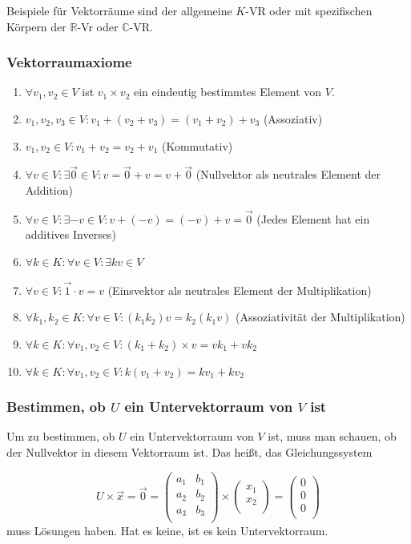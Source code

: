 \documentclass{scrartcl}
\begin{document}
Beispiele für Vektorräume sind der allgemeine $K$-VR oder mit spezifischen Körpern
der $\mathbb{R}$-Vr oder $\mathbb{C}$-VR.

\subsubsection{Vektorraumaxiome}

\begin{enumerate}
	\item $\forall v_1, v_2 \in V$ ist $v_1 \times v_2$ ein eindeutig bestimmtes Element von $V$.
	\item $v_1, v_2, v_3 \in V: v_1 + (v_2 + v_3) = (v_1 + v_2) + v_3$ (Assoziativ)
	\item $v_1, v_2 \in V: v_1 + v_2 = v_2 + v_1$ (Kommutativ)
	\item $\forall v \in V: \exists \vec{0} \in V: v = \vec{0} + v = v + \vec{0}$ (Nullvektor als neutrales Element der Addition)
	\item $\forall v \in V: \exists -v \in V: v + (-v) = (-v) + v = \vec{0}$ (Jedes Element hat ein additives Inverses)
	\item $\forall k \in K: \forall v \in V: \exists kv \in V$
	\item $\forall v \in V: \vec{1}\cdot v = v$ (Einsvektor als neutrales Element der Multiplikation)
	\item $\forall k_1, k_2 \in K: \forall v \in V: (k_1k_2)v = k_2(k_1v)$ (Assoziativität der Multiplikation)
	\item $\forall k \in K: \forall v_1, v_2 \in V: (k_1 + k_2) \times v = vk_1 + vk_2$
	\item $\forall k \in K: \forall v_1, v_2 \in V: k(v_1 + v_2) = kv_1 + kv_2$
\end{enumerate}

\subsubsection{Bestimmen, ob $U$ ein Untervektorraum von $V$ ist}

Um zu bestimmen, ob $U$ ein Untervektorraum von $V$ ist, muss man schauen, ob der Nullvektor in diesem Vektorraum ist.
Das heißt, das Gleichungssystem

\begin{equation}
	U\times\vec{x} = \vec{0} =
	\begin{pmatrix*}
		a_1 & b_1 \\
		a_2 & b_2 \\
		a_3 & b_3 \\
	\end{pmatrix*} \times \begin{pmatrix*}
		x_1 \\
		x_2 \\
	\end{pmatrix*} = \begin{pmatrix*}
		0 \\
		0 \\
		0 \\
	\end{pmatrix*}
\end{equation}
muss Lösungen haben. Hat es keine, ist es kein Untervektorraum.
\end{document}
